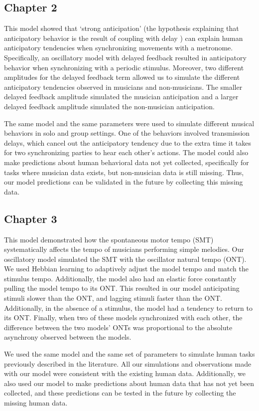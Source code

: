 \documentclass{report}
\begin{document}
\subsection{Chapter 2}
This model showed that `strong anticipation' (the hypothesis explaining that anticipatory behavior is the result of coupling with delay \cite{stepp2010strong}) can explain human anticipatory tendencies when synchronizing movements with a metronome. Specifically, an oscillatory model with delayed feedback resulted in anticipatory behavior when synchronizing with a periodic stimulus. Moreover, two different amplitudes for the delayed feedback term allowed us to simulate the different anticipatory tendencies observed in musicians and non-musicians. The smaller delayed feedback amplitude simulated the musician anticipation and a larger delayed feedback amplitude simulated the non-musician anticipation. 
    
The same model and the same parameters were used to simulate different musical behaviors in solo and group settings. One of the behaviors involved transmission delays, which cancel out the anticipatory tendency due to the extra time it takes for two synchronizing parties to hear each other's actions. The model could also make predictions about human behavioral data not yet collected, specifically for tasks where musician data exists, but non-musician data is still missing. Thus, our model predictions can be validated in the future by collecting this missing data.

\subsection{Chapter 3}
This model demonstrated how the spontaneous motor tempo (SMT) systematically affects the tempo of musicians performing simple melodies. Our oscillatory model simulated the SMT with the oscillator natural tempo (ONT). We used Hebbian learning to adaptively adjust the model tempo and match the stimulus tempo. Additionally, the model also had an elastic force constantly pulling the model tempo to its ONT. This resulted in our model anticipating stimuli slower than the ONT, and lagging stimuli faster than the ONT. Additionally, in the absence of a stimulus, the model had a tendency to return to its ONT. Finally, when two of these models synchronized with each other, the difference between the two models' ONTs was proportional to the absolute asynchrony observed between the models.

We used the same model and the same set of parameters to simulate human tasks previously described in the literature. All our simulations and observations made with our model were consistent with the existing human data. Additionally, we also used our model to make predictions about human data that has not yet been collected, and these predictions can be tested in the future by collecting the missing human data.
    
\end{document}
